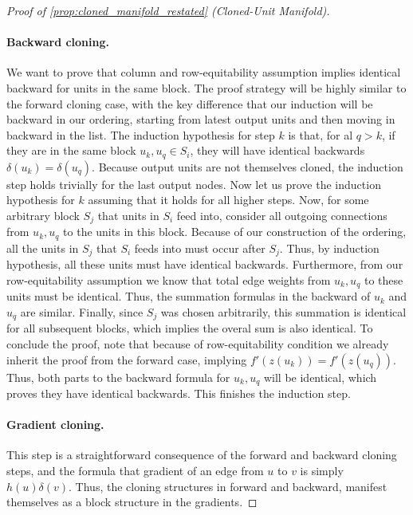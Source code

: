 \documentclass{article}
\numberwithin{figure}{section}
\begin{document}
\begin{proof}[Proof of \cref{prop:cloned_manifold_restated} (Cloned-Unit Manifold)]
\paragraph{‌Backward cloning.} We want to prove that column and row-equitability assumption implies identical backward for units in the same block. The  proof strategy will be highly similar to the forward cloning case, with the key difference that our induction will be backward in our ordering, starting from latest output units and then moving in backward in the list. The induction hypothesis for step $k$ is that, for al $q > k$, if they are in the same block $u_k,u_q\in S_i$, they will have identical backwards $\delta(u_k)=\delta(u_q).$ Because output units are not themselves cloned, the induction step holds trivially for the last output nodes. Now let us prove the induction hypothesis for $k$ assuming that it holds for all higher steps. Now, for some arbitrary block $S_j$ that units in $S_i$ feed into, consider all outgoing connections from $u_k,u_q$ to the units in this block. Because of our construction of the ordering, all the units in $S_j$ that $S_i$ feeds into must occur after $S_j.$ Thus, by induction hypothesis, all these units must have identical backwards. Furthermore, from our row-equitability assumption we know that total edge weights from $u_k,u_q$ to these units must be identical. Thus, the summation formulas in the backward of $u_k$ and $u_q$ are similar. Finally, since $S_j$ was chosen arbitrarily, this summation is identical for all subsequent blocks, which implies the overal sum is also identical. To conclude the proof, note that because of row-equitability condition we already inherit the proof from the forward case, implying  $f'(z(u_k)) = f'(z(u_q)). $ Thus, both parts to the backward formula for $u_k,u_q$ will be identical, which proves they have identical backwards. This finishes the induction step. 
\paragraph{Gradient cloning.} This step is a straightforward consequence of the forward and backward cloning steps, and the formula that gradient of an edge from $u$ to $v$ is simply $h(u)\delta(v).$ Thus, the cloning structures in forward and backward, manifest themselves as a block structure in the gradients. 

\end{proof}
\end{document}
